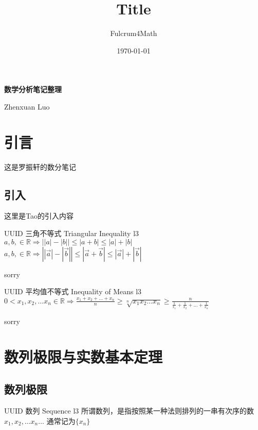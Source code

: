 \documentclass[UTF8, 10pt]{ctexart}
\title{Title}
\author{Fulcrum4Math}
\date{\today}
\begin{document}
\begin{center}
    {\LARGE\textbf{数学分析笔记整理}}

    Zhenxuan Luo
\end{center}

\setcounter{section}{-1}
\section{引言}
    这是罗振轩的数分笔记   
    \subsection{引入}
        这里是Tao的引入内容
        \begin{thm}
            {UUID}
            {三角不等式}
            {Triangular Inequality}
            {l3}
            $a , b , \in \mathbb{R} \Rightarrow{} \left| \left| a \right| - \left| b \right| \right| \le \left| a + b \right| \le \left| a \right| + \left| b \right|$
            $a , b , \in \mathbb{R} \Rightarrow{} \left| \left| \vec{a}  \right| - \left| \vec{b} \right| \right| \le \left| \vec{a} + \vec{b} \right| \le \left| \vec{a} \right| + \left| \vec{b} \right|$            
        \end{thm}
        
        \begin{prf}
            sorry
        \end{prf}

        \begin{thm}
            {UUID}
            {平均值不等式}
            {Inequality of Means}
            {l3}
            $ 0 < x_1 , x_2 , \ldots x_n \in \mathbb{R} \Rightarrow \frac{x_1 + x_2 + \ldots + x_n}{n} \ge \sqrt[n]{x_1 x_2\ldots x_n} \ge \frac{n}{\frac{1}{x_1} + \frac{1}{x_2} + \ldots + \frac{1}{x_n}}$
        \end{thm}

        \begin{prf}
            sorry
        \end{prf}

\section{数列极限与实数基本定理}
    \subsection{数列极限}
        \begin{dfn}
            {UUID}
            {数列}
            {Sequence}
            {l3}
            所谓数列，是指按照某一种法则排列的一串有次序的数$x_1 , x_2 , \ldots x_n \ldots$ 通常记为$\{ x_n \}$
        \end{dfn}
\end{document}
